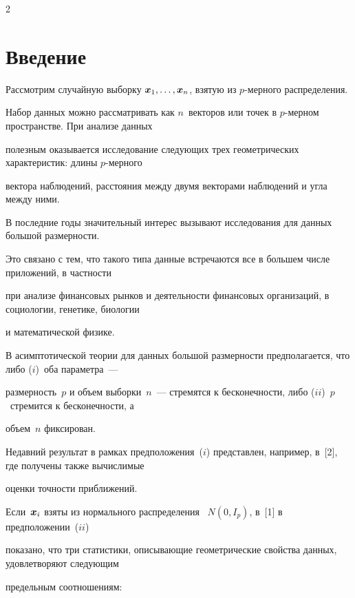       \begin{multicols}{2}



      \label{st\stat}



\section{Введение}



Рассмотрим случайную выборку  $\mbox{\boldmath{$x$}}_1, \ldots, \mbox{\boldmath{$x$}}_n$, взятую из  $p$-мер\-но\-го распределения. 

Набор данных можно рассматривать как  $n$~векторов или точек в $p$-мер\-ном пространстве. При анализе данных 

полезным оказывается исследование следующих трех геометрических характеристик: длины $p$-мер\-но\-го 

вектора наблюдений, расстояния между двумя векторами наблюдений и угла между ними.



В последние годы значительный интерес вызывают исследования для данных большой раз\-мер\-ности. 

Это связано с тем, что такого типа данные встречаются все в большем числе приложений, в частности 

при анализе финансовых рынков и деятельности финансовых организаций, в социологии, генетике, биологии 

и математической физике.

В асимптотической теории для данных большой размерности предполагается, что либо ($i$)~оба параметра~--- 

размерность~$p$ и объем выборки~$n$~--- стремятся к бесконечности, либо ($ii$)~$p$~стремится к бесконечности, а 

объем~$n$ фиксирован.



 Недавний результат в рамках предположения~($i$) представлен, например, в~[2], где получены также вычислимые 

 оценки точности приближений.



 Если~$\mbox{\boldmath{$x$}}_i$  взяты из нормального распределения~ $N(0, I_p)$,  в~[1] в предположении~($ii$) 

 показано, что три статистики, описывающие геометрические свойства данных, удовлетворяют следующим 

 предельным соотношениям:


\end{multicols}
